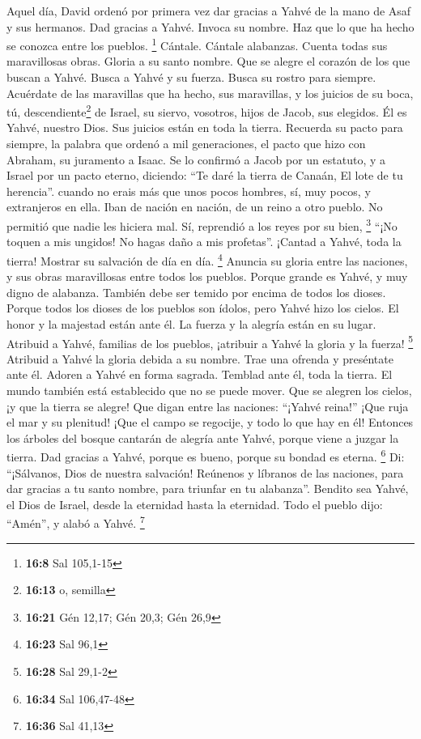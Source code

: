  Aquel día, David ordenó por primera vez dar gracias a
Yahvé de la mano de Asaf y sus hermanos.  Dad gracias a
Yahvé. Invoca su nombre. Haz que lo que ha hecho se conozca entre los
pueblos. \footnote{\textbf{16:8} Sal 105,1-15}  Cántale.
Cántale alabanzas. Cuenta todas sus maravillosas obras. 
Gloria a su santo nombre. Que se alegre el corazón de los que buscan a
Yahvé.  Busca a Yahvé y su fuerza. Busca su rostro para
siempre.  Acuérdate de las maravillas que ha hecho, sus
maravillas, y los juicios de su boca,  tú,
descendiente\footnote{\textbf{16:13} o, semilla} de Israel, su siervo,
vosotros, hijos de Jacob, sus elegidos.  Él es Yahvé,
nuestro Dios. Sus juicios están en toda la tierra. 
Recuerda su pacto para siempre, la palabra que ordenó a mil
generaciones,  el pacto que hizo con Abraham, su
juramento a Isaac.  Se lo confirmó a Jacob por un
estatuto, y a Israel por un pacto eterno,  diciendo: ``Te
daré la tierra de Canaán, El lote de tu herencia''. 
cuando no erais más que unos pocos hombres, sí, muy pocos, y extranjeros
en ella.  Iban de nación en nación, de un reino a otro
pueblo.  No permitió que nadie les hiciera mal. Sí,
reprendió a los reyes por su bien, \footnote{\textbf{16:21} Gén 12,17;
  Gén 20,3; Gén 26,9}  ``¡No toquen a mis ungidos! No
hagas daño a mis profetas''.  ¡Cantad a Yahvé, toda la
tierra! Mostrar su salvación de día en día. \footnote{\textbf{16:23} Sal
  96,1}  Anuncia su gloria entre las naciones, y sus
obras maravillosas entre todos los pueblos.  Porque
grande es Yahvé, y muy digno de alabanza. También debe ser temido por
encima de todos los dioses.  Porque todos los dioses de
los pueblos son ídolos, pero Yahvé hizo los cielos.  El
honor y la majestad están ante él. La fuerza y la alegría están en su
lugar.  Atribuid a Yahvé, familias de los pueblos,
¡atribuir a Yahvé la gloria y la fuerza! \footnote{\textbf{16:28} Sal
  29,1-2}  Atribuid a Yahvé la gloria debida a su nombre.
Trae una ofrenda y preséntate ante él. Adoren a Yahvé en forma sagrada.
 Temblad ante él, toda la tierra. El mundo también está
establecido que no se puede mover.  Que se alegren los
cielos, ¡y que la tierra se alegre! Que digan entre las naciones:
``¡Yahvé reina!''  ¡Que ruja el mar y su plenitud! ¡Que
el campo se regocije, y todo lo que hay en él!  Entonces
los árboles del bosque cantarán de alegría ante Yahvé, porque viene a
juzgar la tierra.  Dad gracias a Yahvé, porque es bueno,
porque su bondad es eterna. \footnote{\textbf{16:34} Sal 106,47-48}
 Di: ``¡Sálvanos, Dios de nuestra salvación! Reúnenos y
líbranos de las naciones, para dar gracias a tu santo nombre, para
triunfar en tu alabanza''.  Bendito sea Yahvé, el Dios de
Israel, desde la eternidad hasta la eternidad. Todo el pueblo dijo:
``Amén'', y alabó a Yahvé. \footnote{\textbf{16:36} Sal 41,13}

